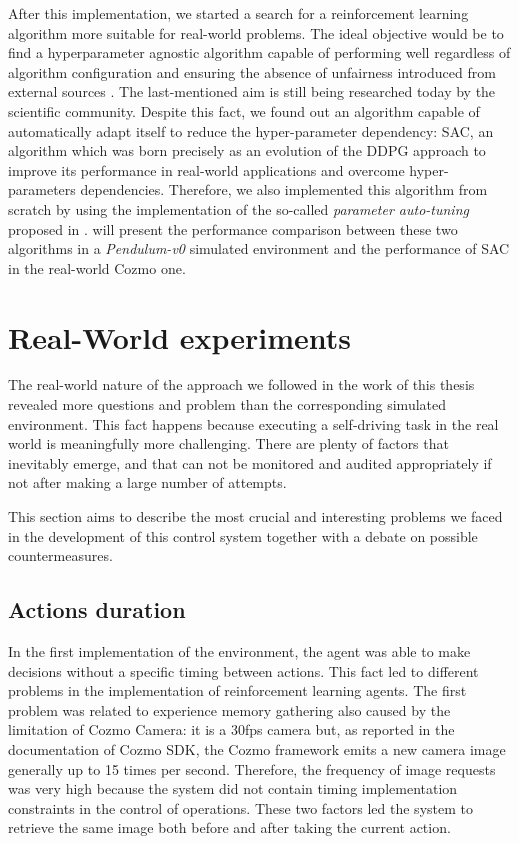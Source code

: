 After this implementation, we started a search for a reinforcement learning algorithm more suitable for real-world problems.
The ideal objective would be to find a hyperparameter agnostic algorithm capable of performing well regardless of algorithm configuration and ensuring the absence of unfairness introduced from external sources \cite{henderson2018deep}.
The last-mentioned aim is still being researched today by the scientific community.
Despite this fact, we found out an algorithm capable of automatically adapt itself to reduce the hyper-parameter dependency: SAC, an algorithm which was born precisely as an evolution of the DDPG approach to improve its performance in real-world applications and overcome hyper-parameters dependencies.
Therefore, we also implemented this algorithm from scratch by using the implementation of the so-called \textit{parameter auto-tuning} proposed in \cite{haarnoja2018soft, haarnoja2018alg}.
 will present the performance comparison between these two algorithms in a \textit{Pendulum-v0} simulated environment and the performance of SAC in the real-world Cozmo one.

\section{Real-World experiments}

The real-world nature of the approach we followed in the work of this thesis revealed more questions and problem than the corresponding simulated environment.
This fact happens because executing a self-driving task in the real world is meaningfully more challenging.
There are plenty of factors that inevitably emerge, and that can not be monitored and audited appropriately if not after making a large number of attempts.

This section aims to describe the most crucial and interesting problems we faced in the development of this control system together with a debate on possible countermeasures.

\subsection{Actions duration} \label{subsec:actions-duration}

In the first implementation of the environment, the agent was able to make decisions without a specific timing between actions.
This fact led to different problems in the implementation of reinforcement learning agents.
The first problem was related to experience memory gathering also caused by the limitation of Cozmo Camera: it is a 30fps camera but, as reported in the documentation of Cozmo SDK, the Cozmo framework emits a new camera image generally up to 15 times per second.
Therefore, the frequency of image requests was very high because the system did not contain timing implementation constraints in the control of operations.
These two factors led the system to retrieve the same image both before and after taking the current action.

